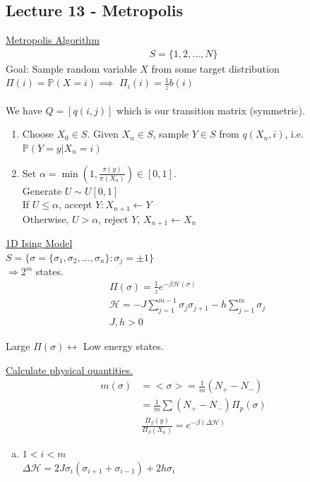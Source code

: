 \documentclass[12pt, letterpaper]{article}
\begin{document}
\subsection{Lecture 13 - Metropolis}
\underline{Metropolis Algorithm} 
\begin{align*}
    S = \{1,2,...,N\}
\end{align*}
Goal: Sample random variable $X$ from some target distribution $\Pi(i) = \mathbb{P}(X=i)\implies$
$\Pi_i (i) = \frac 1z b(i)$ \\ \\
We have $Q = [q(i,j)]$ which is our transition matrix (symmetric).
\begin{enumerate}
    \item Choose $X_0 \in S$. Given $X_n \in S$, sample $Y \in S$ from $q(X_n, i)$, i.e. $\mathbb{P}(Y=y | X_n = i)$
    \item Set $\alpha = \min(1, \frac{\pi(y)}{\pi(X_n)}) \in [0,1]$. \\
    Generate $U \sim U[0,1]$ \\
    If $U\le \alpha$, accept $Y:X_{n+1} \leftarrow Y$ \\
    Otherwise, $U > \alpha$, reject $Y$, $X_{n+1}\leftarrow X_n$
\end{enumerate}

\noindent \underline{1D Ising Model} \\
$S = \{\sigma = \{\sigma_1, \sigma_2, ... , \sigma_n\} : \sigma_j = \pm 1\}$ \\
$\Rightarrow 2^m$ states.
\begin{align*}
    &\Pi (\sigma) = \frac 1z e^{-\beta \mathcal{H}(\sigma)} \\
    &\mathcal{H} = - J \sum_{j=1}^{m-1} \sigma_j \sigma_{j+1} - h\sum_{j=1}^{m}\sigma_j \\
    & J, h > 0 
\end{align*}

Large $\Pi (\sigma) \longleftrightarrow $ Low energy states.

\noindent \underline{Calculate physical quantities.} \\
\begin{align*}
    m(\sigma) &= <\sigma> = \frac 1m (N_{+} - N_{-}) \\ 
    &= \frac 1m \sum (N_+ - N_-) \Pi_p (\sigma)
\end{align*}
\begin{align*}
    \frac{\Pi_\beta (y)}{\Pi_\beta (X_n)} = e^{-\beta ( \Delta \mathcal{H})}
\end{align*}
\begin{enumerate}[a.]
    \item $1 < i < m$ \\
        $\Delta \mathcal{H} = 2J \sigma_i(\sigma_{i+1} + \sigma_{i-1}) + 2h\sigma_i$
\end{enumerate}
\end{document}
